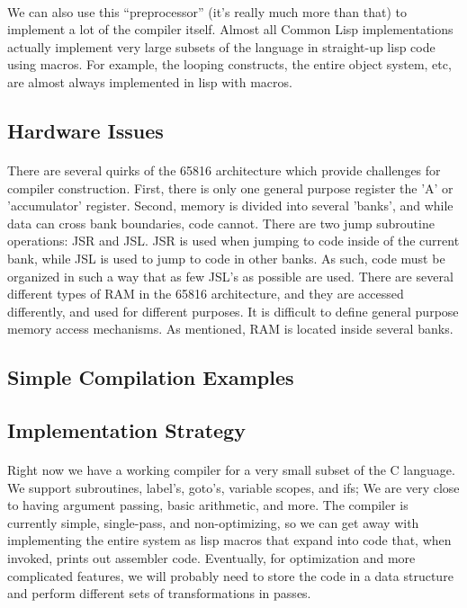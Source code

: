 \documentclass {article}
\begin{document}
\paragraph{}
We can also use this ``preprocessor'' (it's really much more than
that) to implement a lot of the compiler itself.  Almost all Common
Lisp implementations actually implement very large subsets of the
language in straight-up lisp code using macros.  For example, the
looping constructs, the entire object system, etc, are almost always
implemented in lisp with macros.

\subsection{Hardware Issues}
\paragraph{}
There are several quirks of the 65816 architecture which provide
challenges for compiler construction.  First, there is only one
general purpose register the 'A' or 'accumulator' register.  Second,
memory is divided into several 'banks', and while data can cross bank
boundaries, code cannot.  There are two jump subroutine operations:
JSR and JSL.  JSR is used when jumping to code inside of the current
bank, while JSL is used to jump to code in other banks.  As such, code
must be organized in such a way that as few JSL's as possible are
used.  There are several different types of RAM in the 65816
architecture, and they are accessed differently, and used for
different purposes.  It is difficult to define general purpose memory
access mechanisms.  As mentioned, RAM is located inside several banks.

\subsection{Simple Compilation Examples}
\subsection{Implementation Strategy}

\paragraph{}
Right now we have a working compiler for a very small subset of the C
language.  We support subroutines, label's, goto's, variable scopes,
and ifs; We are very close to having argument passing, basic
arithmetic, and more.  The compiler is currently simple, single-pass,
and non-optimizing, so we can get away with implementing the entire
system as lisp macros that expand into code that, when invoked, prints
out assembler code.  Eventually, for optimization and more complicated
features, we will probably need to store the code in a data structure
and perform different sets of transformations in passes.
\end{document}
